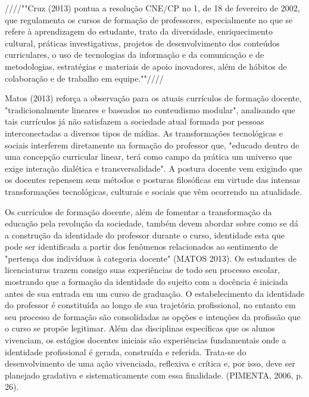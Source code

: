     
	////""Cruz (2013) pontua a resolução CNE/CP no 1, de 18 de fevereiro de 2002, que regulamenta os cursos de formação de professores, especialmente no que se refere à aprendizagem do estudante, trato da diversidade, enriquecimento cultural, práticas investigativas, projetos de desenvolvimento dos conteúdos curriculares, o uso de tecnologias da informação e da comunicação e de metodologias, estratégias e materiais de apoio inovadores, além de hábitos de colaboração e de trabalho em equipe.""////
    
    
	Matos (2013) reforça a observação para os atuais currículos de formação docente, "tradicionalmente lineares e baseados no conteudismo modular", analisando que tais currículos já não satisfazem a sociedade atual formada por pessoas interconectadas a diversos tipos de mídias. As transformações tecnológicas e sociais interferem diretamente na formação do professor que, "educado dentro de uma concepção curricular linear, terá como campo da prática um universo que exige interação dialética e transversalidade". A postura docente vem exigindo que os docentes repensem seus métodos e posturas filosóficas em virtude das intensas transformações tecnológicas, culturais e sociais que vêm ocorrendo na atualidade.	
    
    
	Os currículos de formação docente, além de fomentar a transformação da educação pela revolução da sociedade, também devem abordar sobre como se dá a construção da identidade do professor durante o curso, identidade esta que pode ser identificada a partir dos fenômenos relacionados ao sentimento de "pertença dos indivíduos à categoria docente" (MATOS 2013). Os estudantes de licenciaturas trazem consigo suas experiências de todo seu processo escolar, mostrando que a formação da identidade do sujeito com a docência é iniciada antes de sua entrada em um curso de graduação. O estabelecimento da identidade do professor é constituída ao longo de sua trajetória profissional, no entanto em seu processo de formação são consolidadas as opções e intenções da profissão que o curso se propõe legitimar. Além das disciplinas específicas que os alunos vivenciam, os estágios docentes iniciais são experiências fundamentais onde a identidade profissional é gerada, construída e referida. Trata-se do desenvolvimento de uma ação vivenciada, reflexiva e crítica e, por isso, deve ser planejado gradativa e sistematicamente com essa finalidade. (PIMENTA, 2006, p. 26).
